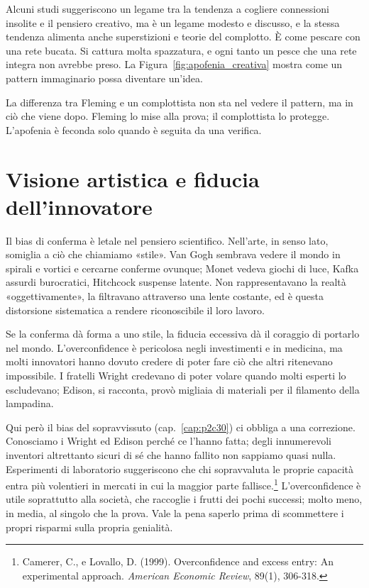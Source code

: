 Alcuni studi suggeriscono un legame tra la tendenza a cogliere connessioni insolite e il pensiero creativo, ma è un legame modesto e discusso, e la stessa tendenza alimenta anche superstizioni e teorie del complotto. È come pescare con una rete bucata. Si cattura molta spazzatura, e ogni tanto un pesce che una rete integra non avrebbe preso. La Figura~\ref{fig:apofenia_creativa} mostra come un pattern immaginario possa diventare un'idea.


La differenza tra Fleming e un complottista non sta nel vedere il pattern, ma in ciò che viene dopo. Fleming lo mise alla prova; il complottista lo protegge. L'apofenia è feconda solo quando è seguita da una verifica.

\section{Visione artistica e fiducia dell'innovatore}

Il bias di conferma è letale nel pensiero scientifico. Nell'arte, in senso lato, somiglia a ciò che chiamiamo «stile». Van Gogh sembrava vedere il mondo in spirali e vortici e cercarne conferme ovunque; Monet vedeva giochi di luce, Kafka assurdi burocratici, Hitchcock suspense latente. Non rappresentavano la realtà «oggettivamente», la filtravano attraverso una lente costante, ed è questa distorsione sistematica a rendere riconoscibile il loro lavoro.

Se la conferma dà forma a uno stile, la fiducia eccessiva dà il coraggio di portarlo nel mondo. L'overconfidence è pericolosa negli investimenti e in medicina, ma molti innovatori hanno dovuto credere di poter fare ciò che altri ritenevano impossibile. I fratelli Wright credevano di poter volare quando molti esperti lo escludevano; Edison, si racconta, provò migliaia di materiali per il filamento della lampadina.

Qui però il bias del sopravvissuto (cap.~\ref{cap:p2c30}) ci obbliga a una correzione. Conosciamo i Wright ed Edison perché ce l'hanno fatta; degli innumerevoli inventori altrettanto sicuri di sé che hanno fallito non sappiamo quasi nulla. Esperimenti di laboratorio suggeriscono che chi sopravvaluta le proprie capacità entra più volentieri in mercati in cui la maggior parte fallisce.\footnote{Camerer, C., e Lovallo, D. (1999). Overconfidence and excess entry: An experimental approach. \textit{American Economic Review}, 89(1), 306-318.} L'overconfidence è utile soprattutto alla società, che raccoglie i frutti dei pochi successi; molto meno, in media, al singolo che la prova. Vale la pena saperlo prima di scommettere i propri risparmi sulla propria genialità.

